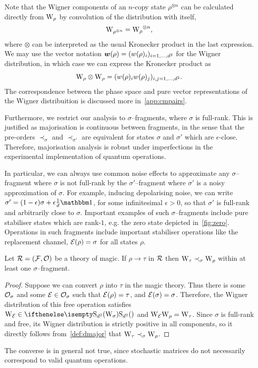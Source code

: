 \documentclass[pra,
aps,
twocolumn,
superscriptaddress,
groupedaddress,
nofootinbib,
reprint
]{revtex4-1}
\begin{document}
Note that the Wigner components of an $n$-copy state $\rho^{\otimes n}$ can be calculated directly from $\W{\rho}$ by convolution of the distribution with itself,
\begin{equation}
	\W{\rho^{\otimes n}} = \W{\rho}^{\otimes n},
\end{equation}
where $\otimes$ can be interpreted as the usual Kronecker product in the last expression.
We may use the vector notation $\bm{w}(\rho) = (w(\rho)_i)_{i=1,\dots,d^2}$ for the Wigner distribution, in which case we can express the Kronecker product as
\begin{equation}
	\W{\rho} \otimes \W{\rho} = (w(\rho)_i w(\rho)_j)_{i,j=1,\dots,d^2}.
\end{equation}
The correspondence between the phase space and pure vector representations of the Wigner distribuition is discussed more in~\cref{app:cmpairs}.

Furthermore, we restrict our analysis to $\sigma$--fragments, where $\sigma$ is full-rank.
This is justified as majorisation is continuous between fragments, in the sense that the pre-orders $\prec_\sigma$ and $\prec_{\sigma'}$ are equivalent for states $\sigma$ and $\sigma'$ which are $\epsilon$-close. 
Therefore, majorisation analysis is robust under imperfections in the experimental implementation of quantum operations.

In particular, we can always use common noise effects to approximate any $\sigma$--fragment where $\sigma$ is not full-rank by the $\sigma'$--fragment where $\sigma'$ is a noisy approximation of $\sigma$. 
For example, inducing depolarising noise, we can write $\sigma' = (1-\epsilon)\sigma + \epsilon\frac{1}{d}\id$, for some infinitesimal $\epsilon > 0$, so that $\sigma'$ is full-rank and arbitrarily close to $\sigma$.
Important examples of such $\sigma$--fragments include pure stabiliser states which are rank-$1$, e.g. the zero state depicted in~\cref{fig:zero}. 
Operations in such fragments include important stabiliser operations like the replacement channel, $\mathcal{E}(\rho) = \sigma$ for all states $\rho$.

\begin{theorem}\label{thm:sigmamajor}
    Let $\mathcal{R} = (\mathcal{F}, \mathcal{O})$ be a theory of magic. If $\rho \longrightarrow \tau$  in $\mathcal{R}$ then  $\W{\tau} \prec_\sigma \W{\rho}$ within at least one $\sigma$--fragment.
\end{theorem}
\begin{proof}
Suppose we can convert $\rho$ into $\tau$ in the magic theory. 
Thus there is some $\mathcal{O}_\sigma$ and some $\mathcal{E} \in \mathcal{O}_\sigma$ such that $\mathcal{E}(\rho) = \tau$, and $\mathcal{E}(\sigma)=\sigma$. 
Therefore, the Wigner distribution of this free operation satisfies $\W{\E} \in \stochw$ and $\W{\E}\W{\rho} = \W{\tau}$. 
Since $\sigma$ is full-rank and free, its Wigner distribution is strictly positive in all components, so it directly follows from~\cref{def:dmajor} that $\W{\tau} \prec_{\sigma} \W{\rho}$.
\end{proof}
The converse is in general not true, since stochastic matrices do not necessarily correspond to valid quantum operations.
\end{document}
